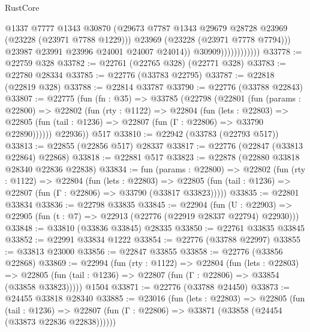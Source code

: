 \begin{lexlean}{RustCore}
\begin{coremodule}
                                  @1337
                                  @7777
                                  @1343
                                  @30870
                                  (@29673
                                    @7787
                                    @1343
                                    @29679
                                    @28728
                                    @23969
                                    (@23228 (@23971 @7788 @1229)))
                                  @23969
                                  (@23228 (@23971 @7778 @7794)))
                                @23987
                                @23991
                                @23996
                                @24001
                                @24007
                                @24014))
                            @30909))))))))))))
@33778 := @22759 @328
@33782 := @22761 (@22765 @328) (@22771 @328)
@33783 := @22780 @28334
@33785 := @22776 (@33783 @22795)
@33787 := @22818 (@22819 @328)
@33788 := @22814 @33787
@33790 := @22776 (@33788 @22843)
@33807 := @22775
    (fun (fn : @35) =>
    @33785
      (@22798
        (@22801
          (fun (params : @22800) =>
          @22802
            (fun (rty : @1122) =>
            @22804
              (fun (lets : @22803) =>
              @22805 (fun (tail : @1236) => @22807 (fun (Γ : @22806) => @33790 @22890))))))
        @22936))
    @517
@33810 := @22942 (@33783 (@22793 @517))
@33813 := @22855 (@22856 @517) @28337
@33817 := @22776 (@22847 (@33813 @22864) @22868)
@33818 := @22881 @517
@33823 := @22878 (@22880 @33818 @28340 @22836 @22838)
@33834 := fun (params : @22800) =>
  @22802
    (fun (rty : @1122) =>
    @22804
      (fun (lets : @22803) =>
      @22805 (fun (tail : @1236) => @22807 (fun (Γ : @22806) => @33790 (@33817 @33823)))))
@33835 := @22801 @33834
@33836 := @22798 @33835
@33845 := @22904
    (fun (U : @22903) => @22905 (fun (t : @7) => @22913 (@22776 (@22919 @28337 @22794) @22930)))
@33848 := @33810 (@33836 @33845) @28335
@33850 := @22761 @33835 @33845
@33852 := @22991 @33834 @1222
@33854 := @22776 (@33788 @22997)
@33855 := @33813 @23000
@33856 := @22847 @33855
@33858 := @22776 (@33856 @22868)
@33869 := @22994
    (fun (rty : @1122) =>
    @22804
      (fun (lets : @22803) =>
      @22805 (fun (tail : @1236) => @22807 (fun (Γ : @22806) => @33854 (@33858 @33823)))))
    @1504
@33871 := @22776 (@33788 @24450)
@33873 := @24455 @33818 @28340
@33885 := @23016
    (fun (lets : @22803) =>
    @22805
      (fun (tail : @1236) =>
      @22807 (fun (Γ : @22806) => @33871 (@33858 (@24454 (@33873 @22836 @22838))))))

\end{coremodule}
\end{lexlean}
